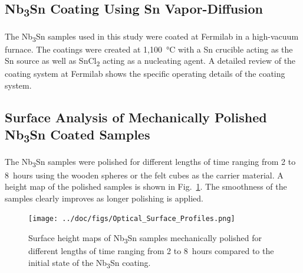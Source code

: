 \documentclass[reprint,amsmath,amssymb,aps]{revtex4-2}%
\begin{document}
%
\subsection{Nb\textsubscript{3}Sn Coating Using Sn Vapor-Diffusion}%
\label{subsec:nb3sncoating}%
The Nb\textsubscript{3}Sn samples used in this study were coated at Fermilab in a high-vacuum furnace. The coatings were created at 1,100~°C with a Sn crucible acting as the Sn source as well as SnCl\textsubscript{2} acting as a nucleating agent. A detailed review of the coating system at Fermilab shows the specific operating details of the coating system\cite{posen2017nb3sn}.

%
\subsection{Surface Analysis of Mechanically Polished Nb\textsubscript{3}Sn Coated Samples}%
\label{subsec:sampleanalysis}%
The Nb\textsubscript{3}Sn samples were polished for different lengths of time ranging from 2 to 8~hours using the wooden spheres or the felt cubes as the carrier material. A height map of the polished samples is shown in Fig.~\ref{fig:opticalsurfaceprofiles}. The smoothness of the samples clearly improves as longer polishing is applied.

\begin{figure}[t]%
\centering%
\texttt{[image: ../doc/figs/Optical\_Surface\_Profiles.png]}%
\caption{Surface height maps of Nb\textsubscript{3}Sn samples mechanically polished for different lengths of time ranging from 2 to 8~hours compared to the initial state of the Nb\textsubscript{3}Sn coating.}%
\label{fig:opticalsurfaceprofiles}%
\end{figure}

%
\end{document}
